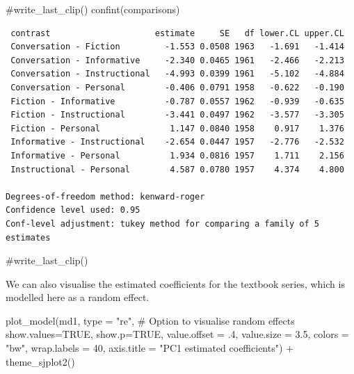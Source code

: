 \documentclass[
  letterpaper,
  DIV=11,
  numbers=noendperiod]{scrreprt}
\newenvironment{Shaded}{\begin{snugshade}}{\end{snugshade}}
\newcommand{\AttributeTok}[1]{\textcolor[rgb]{0.40,0.45,0.13}{#1}}
\newcommand{\CommentTok}[1]{\textcolor[rgb]{0.37,0.37,0.37}{#1}}
\newcommand{\ConstantTok}[1]{\textcolor[rgb]{0.56,0.35,0.01}{#1}}
\newcommand{\DecValTok}[1]{\textcolor[rgb]{0.68,0.00,0.00}{#1}}
\newcommand{\FloatTok}[1]{\textcolor[rgb]{0.68,0.00,0.00}{#1}}
\newcommand{\FunctionTok}[1]{\textcolor[rgb]{0.28,0.35,0.67}{#1}}
\newcommand{\NormalTok}[1]{\textcolor[rgb]{0.00,0.23,0.31}{#1}}
\newcommand{\SpecialCharTok}[1]{\textcolor[rgb]{0.37,0.37,0.37}{#1}}
\newcommand{\StringTok}[1]{\textcolor[rgb]{0.13,0.47,0.30}{#1}}
\begin{document}
\begin{Shaded}
\begin{Highlighting}[]
\CommentTok{\#write\_last\_clip()}
\FunctionTok{confint}\NormalTok{(comparisons)}
\end{Highlighting}
\end{Shaded}

\begin{verbatim}
 contrast                     estimate     SE   df lower.CL upper.CL
 Conversation - Fiction         -1.553 0.0508 1963   -1.691   -1.414
 Conversation - Informative     -2.340 0.0465 1961   -2.466   -2.213
 Conversation - Instructional   -4.993 0.0399 1961   -5.102   -4.884
 Conversation - Personal        -0.406 0.0791 1958   -0.622   -0.190
 Fiction - Informative          -0.787 0.0557 1962   -0.939   -0.635
 Fiction - Instructional        -3.441 0.0497 1962   -3.577   -3.305
 Fiction - Personal              1.147 0.0840 1958    0.917    1.376
 Informative - Instructional    -2.654 0.0447 1957   -2.776   -2.532
 Informative - Personal          1.934 0.0816 1957    1.711    2.156
 Instructional - Personal        4.587 0.0780 1957    4.374    4.800

Degrees-of-freedom method: kenward-roger 
Confidence level used: 0.95 
Conf-level adjustment: tukey method for comparing a family of 5 estimates 
\end{verbatim}

\begin{Shaded}
\begin{Highlighting}[]
\CommentTok{\#write\_last\_clip()}
\end{Highlighting}
\end{Shaded}

We can also visualise the estimated coefficients for the textbook
series, which is modelled here as a random effect.

\begin{Shaded}
\begin{Highlighting}[]
\FunctionTok{plot\_model}\NormalTok{(md1, }
           \AttributeTok{type =} \StringTok{"re"}\NormalTok{, }\CommentTok{\# Option to visualise random effects}
           \AttributeTok{show.values=}\ConstantTok{TRUE}\NormalTok{, }
           \AttributeTok{show.p=}\ConstantTok{TRUE}\NormalTok{,}
           \AttributeTok{value.offset =}\NormalTok{ .}\DecValTok{4}\NormalTok{,}
           \AttributeTok{value.size =} \FloatTok{3.5}\NormalTok{,}
           \AttributeTok{colors =} \StringTok{"bw"}\NormalTok{,}
           \AttributeTok{wrap.labels =} \DecValTok{40}\NormalTok{,}
           \AttributeTok{axis.title =} \StringTok{"PC1 estimated coefficients"}\NormalTok{) }\SpecialCharTok{+}
  \FunctionTok{theme\_sjplot2}\NormalTok{()}
\end{Highlighting}
\end{Shaded}
\end{document}
